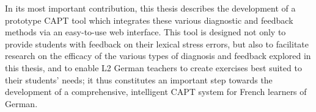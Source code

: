 In its most important contribution, this thesis describes the development of a prototype CAPT tool %
which integrates these various diagnostic and feedback methods via an easy-to-use web interface. 
This tool is designed not only to provide students with feedback on their lexical stress errors, but also to facilitate research on the efficacy of the various
 types of diagnosis and feedback
 explored in this thesis, and to enable L2 German teachers 
 to create exercises best suited to their students' needs; it thus constitutes an important step towards the development of a comprehensive, intelligent CAPT system for French learners of German. 




%
